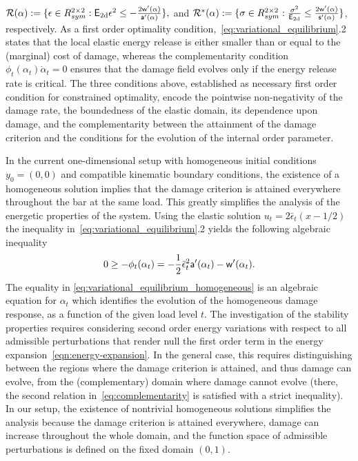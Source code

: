 \documentclass[10pt]{article}
\begin{document}
$\mathcal{R}(\alpha):=\{\epsilon\in R^{2\times 2}_{sym}: \mathsf{E_{\text{2d}}} \epsilon^2 \leq -\frac{2 \mathsf{w}'(\alpha)}{\mathsf{a}'(\alpha)}\},$ and $
\mathcal{R}^*(\alpha):=\{\sigma\in R^{2\times 2}_{sym}: \frac{\sigma^2}{\mathsf{E_{\text{2d}}}} \leq \frac{2 \mathsf{w}'(\alpha)}{\mathsf{s}'(\alpha)}\}$, respectively.
%
%
As a first order optimality condition,~\eqref{eq:variational_equilibrium}.2 states that the local elastic energy release is either smaller than or equal to the (marginal) cost of damage, whereas the complementarity condition $\phi_t(\alpha_t)\dot \alpha_t = 0$ ensures that the damage field evolves only if the energy release rate is critical.
The three conditions above, established as necessary first order condition for constrained optimality, encode the pointwise non-negativity of the damage rate, the boundedness of the elastic domain, its dependence upon damage, and the complementarity between the attainment of the damage criterion and the conditions for the evolution of the internal order parameter. 

In the current one-dimensional setup with homogeneous initial conditions $y_0=(0, 0)$ and compatible kinematic boundary conditions, the existence of a homogeneous solution implies that the damage criterion is attained everywhere throughout the bar at the same load. This greatly simplifies the analysis of the energetic properties of the system. 
Using the elastic solution $u_t = 2\bar \epsilon_t(x-1/2)$ 
%
 the inequality in~\eqref{eq:variational_equilibrium}.2 yields the following algebraic inequality
\begin{equation}
    \label{eq:variational_equilibrium_homogeneous}
    0 \geq -\phi_t(\alpha_t)= -\frac{1}{2}\bar \epsilon_t^2 \mathsf{a}'(\alpha_t)-\mathsf{w}'(\alpha_t).
\end{equation}
%
%
%
%
%
%
The equality in \eqref{eq:variational_equilibrium_homogeneous} is an algebraic equation for $\alpha_t$ which identifies the evolution of the homogeneous damage response, as a function of the given load level $t$.
The investigation of the stability properties requires  
considering second order energy variations with respect to all admissible perturbations that render null the first order term in the energy expansion~\eqref{eqn:energy-expansion}.
In the general case, this requires distinguishing between the regions where the damage criterion is attained, and thus damage can evolve, from the (complementary) domain where damage cannot evolve (there, the second relation in~\eqref{eq:complementarity} is satisfied with a strict inequality).
In our setup, the existence of nontrivial homogeneous solutions simplifies the analysis because the damage criterion is attained everywhere, damage can increase throughout the whole domain, and the function space of admissible perturbations is defined on the fixed domain $(0, 1)$.
\end{document}
